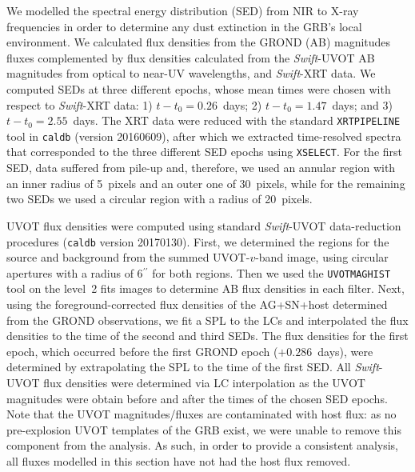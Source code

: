 \documentclass[traditabstract,longauth]{aa}
\begin{document}
We modelled the spectral energy distribution (SED) from NIR to X-ray frequencies in order to determine any dust extinction in the GRB's local environment. We calculated flux densities from the GROND (AB) magnitudes fluxes complemented by flux densities calculated from the \emph{Swift}-UVOT AB magnitudes from optical to near-UV wavelengths, and \emph{Swift}-XRT data. We computed SEDs at three different epochs, whose mean times were chosen with respect to \emph{Swift}-XRT data: 1) $t-t_0 = 0.26$~days; 2) $t -t_0 = 1.47$~days; and 3) $t -t_0 = 2.55$~days. The XRT data were reduced with the standard \texttt{XRTPIPELINE} tool in \texttt{caldb} (version 20160609), after which we extracted time-resolved spectra that corresponded to the three different SED epochs using \texttt{XSELECT}. For the first SED, data suffered from pile-up and, therefore, we used an annular region with an inner radius of 5~pixels and an outer one of 30~pixels, while for the remaining two SEDs we used a circular region with a radius of 20~pixels.

UVOT flux densities were computed using standard \emph{Swift}-UVOT data-reduction procedures (\texttt{caldb} version 20170130). First, we determined the regions for the source and background from the summed UVOT-$v$-band image, using circular apertures with a radius of 6$^{\prime\prime}$ for both regions. Then we used the \texttt{UVOTMAGHIST} tool on the level~2 fits images to determine AB flux densities in each filter.  Next, using the foreground-corrected flux densities of the AG+SN+host determined from the GROND observations, we fit a SPL to the LCs and interpolated the flux densities to the time of the second and third SEDs.  The flux densities for the first epoch, which occurred before the first GROND epoch ($+0.286$~days), were determined by extrapolating the SPL to the time of the first SED.  All \emph{Swift}-UVOT flux densities were determined via LC interpolation as the UVOT magnitudes were obtain before and after the times of the chosen SED epochs.  Note that the UVOT magnitudes/fluxes are contaminated with host flux: as no pre-explosion UVOT templates of the GRB exist, we were unable to remove this component from the analysis.  As such, in order to provide a consistent analysis, all fluxes modelled in this section have not had the host flux removed.
\end{document}
